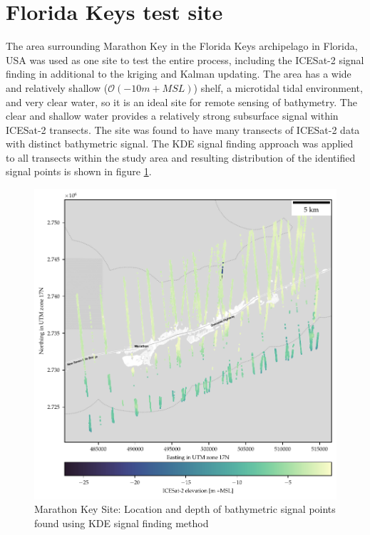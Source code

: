 


\section{Florida Keys test site}


The area surrounding Marathon Key in the Florida Keys archipelago in Florida, USA was used as one site to test the entire process, including the ICESat-2 signal finding in additional to the kriging and Kalman updating. The area has a wide and relatively shallow ($\mathcal{O}(-10 m +MSL)$) shelf, a microtidal tidal environment, and very clear water, so it is an ideal site for remote sensing of bathymetry. The clear and shallow water provides a relatively strong subsurface signal within ICESat-2 transects. The site was found to have many transects of ICESat-2 data with distinct bathymetric signal. The KDE signal finding approach was applied to all transects within the study area and resulting distribution of the identified signal points is shown in figure \ref{fig:keys-photons}.

\begin{figure}[h]
    \centering
    \includegraphics{figures/florida_keys_photon_map.pdf}
    \caption{Marathon Key Site: Location and depth of bathymetric signal points found using KDE signal finding method}
    \label{fig:keys-photons}
\end{figure}


